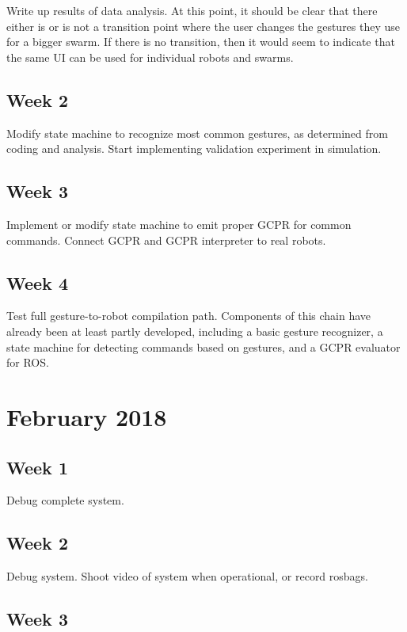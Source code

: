 Write up results of data analysis.
At this point, it should be clear that there either is or is not a transition point where the user changes the gestures they use for a bigger swarm. 
If there is no transition, then it would seem to indicate that the same UI can be used for individual robots and swarms. 

\subsection{Week 2}

Modify state machine to recognize most common gestures, as determined from coding and analysis. 
Start implementing validation experiment in simulation. 

\subsection{Week 3}

Implement or modify state machine to emit proper GCPR for common commands. 
Connect GCPR and GCPR interpreter to real robots.
 
\subsection{Week 4}

Test full gesture-to-robot compilation path. Components of this chain have already been at least partly developed, including a basic gesture recognizer, a state machine for detecting commands based on gestures, and a GCPR evaluator for ROS.

\section{February 2018}

\subsection{Week 1}

Debug complete system. 

\subsection{Week 2}

Debug system. 
Shoot video of system when operational, or record rosbags. 

\subsection{Week 3}

